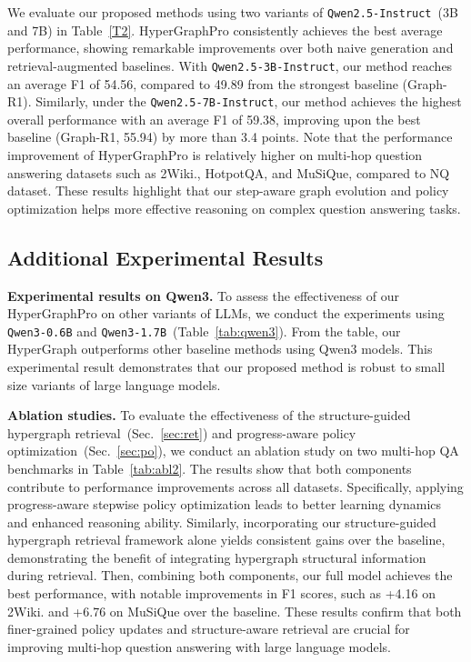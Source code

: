 We evaluate our proposed methods using two variants of \texttt{Qwen2.5-Instruct}~(3B and 7B) in Table~\ref{T2}. 
HyperGraphPro consistently achieves the best average performance, showing remarkable improvements over both naive generation and retrieval-augmented baselines.
With \texttt{Qwen2.5-3B-Instruct}, our method reaches an average F1 of 54.56, compared to 49.89 from the strongest baseline (Graph-R1).
Similarly, under the \texttt{Qwen2.5-7B-Instruct}, our method achieves the highest overall performance with an average F1 of 59.38, improving upon the best baseline (Graph-R1, 55.94) by more than 3.4 points.
Note that the performance improvement of HyperGraphPro is relatively higher on multi-hop question answering datasets such as 2Wiki., HotpotQA, and MuSiQue, compared to NQ dataset.
These results highlight that our step-aware graph evolution and policy optimization helps more effective reasoning on complex question answering tasks.


\subsection{Additional Experimental Results}
\label{sec:additional}



\noindent\textbf{Experimental results on Qwen3.}
To assess the effectiveness of our HyperGraphPro on other variants of LLMs, we conduct the experiments using \texttt{Qwen3-0.6B} and \texttt{Qwen3-1.7B}~(Table~\ref{tab:qwen3}).
From the table, our HyperGraph outperforms other baseline methods using Qwen3 models.
This experimental result demonstrates that our proposed method is robust to small size variants of large language models.

\noindent\textbf{Ablation studies.}
To evaluate the effectiveness of the structure-guided hypergraph retrieval~(Sec.~\ref{sec:ret}) and progress-aware policy optimization~(Sec.~\ref{sec:po}), we conduct an ablation study on two multi-hop QA benchmarks in Table~\ref{tab:abl2}.
The results show that both components contribute to performance improvements across all datasets.
Specifically, applying progress-aware stepwise policy optimization leads to better learning dynamics and enhanced reasoning ability.
Similarly, incorporating our structure-guided hypergraph retrieval framework alone yields consistent gains over the baseline, demonstrating the benefit of integrating hypergraph structural information during retrieval.
Then, combining both components, our full model achieves the best performance, with notable improvements in F1 scores, such as +4.16 on 2Wiki. and +6.76 on MuSiQue over the baseline.
These results confirm that both finer-grained policy updates and structure-aware retrieval are crucial for improving multi-hop question answering with large language models.

